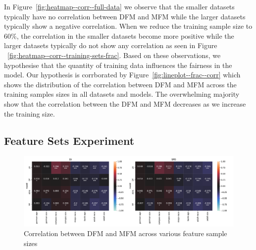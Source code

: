 \documentclass{article}
\begin{document}
In Figure \ref{fig:heatmap--corr--full-data} we observe that the
smaller datasets typically have no correlation between DFM and MFM
while the larger datasets typically show a negative correlation. When
we reduce the training sample size to 60\%, the correlation in the
smaller datasets become more positive while the larger datasets
typically do not show any correlation as seen in Figure
 \ref{fig:heatmap--corr--training-sets-frac}. Based on these
observations, we hypothesise that the quantity of training data
influences the fairness in the model. Our hypothesis is corrborated by
Figure \ref{fig:lineplot--frac--corr} which shows the distribution of
the correlation between DFM and MFM across the training samples sizes
in all datasets and models. The overwhelming majority show that the
correlation between the DFM and MFM decreases as we increase the
training size.






\subsection{Feature Sets Experiment}\label{sec:results-feature-sets}

\begin{figure}
  \centering
  \includegraphics[width=0.95\linewidth]{heatmap--corr--num-features.pdf}
  \caption{Correlation between DFM and MFM across various feature
    sample sizes}
  \label{fig:heatmap--corr--num-features}
\end{figure}
\end{document}
